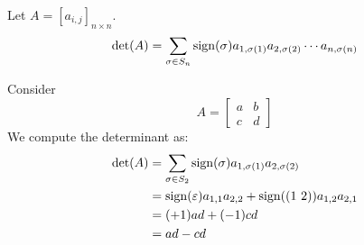 \begin{definition}
    Let \(A = [a_{i, j}]_{n \times n}\).
    \[
        \det(A) = \sum_{\sigma \in S_n} \operatorname{sign}(\sigma)a_{1, \sigma(1)} a_{2, \sigma(2)} \cdots a_{n, \sigma(n)}
    \]
\end{definition}

\begin{nexample}
    Consider
    \[
        A = \begin{bmatrix}
            a & b \\
            c & d
        \end{bmatrix}
    \]
    We compute the determinant as:
    \[
    \begin{aligned}
        \det(A) &= \sum_{\sigma \in S_2} \sign(\sigma) a_{1, \sigma(1)} a_{2, \sigma(2)} \\
                &= \sign(\varepsilon) a_{1, 1} a_{2, 2} + \sign((1\ 2)) a_{1, 2} a_{2, 1} \\
                &= (+1) ad + (-1) cd \\
                &= ad-cd
    \end{aligned}
    \]
\end{nexample}
